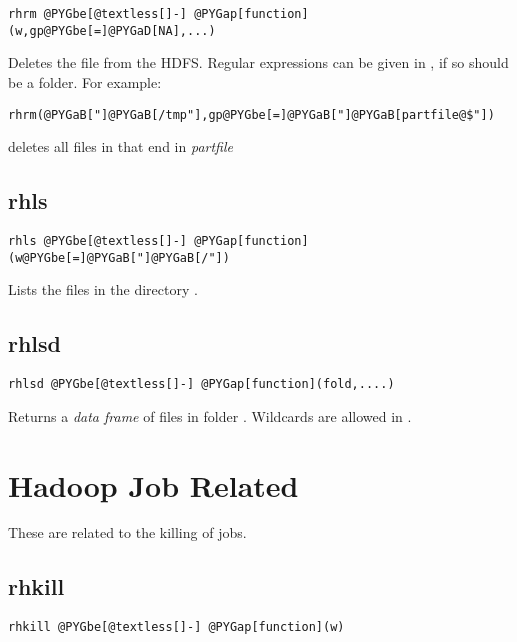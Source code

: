 \documentclass[letterpaper,10pt,english]{manual}
\begin{document}
\begin{Verbatim}[commandchars=@\[\]]
rhrm @PYGbe[@textless[]-] @PYGap[function](w,gp@PYGbe[=]@PYGaD[NA],...)
\end{Verbatim}

Deletes the file  from the HDFS. Regular expressions can be given in
, if so  should be a folder. For example:

\begin{Verbatim}[commandchars=@\[\]]
rhrm(@PYGaB["]@PYGaB[/tmp"],gp@PYGbe[=]@PYGaB["]@PYGaB[partfile@$"])
\end{Verbatim}

deletes all files in  that end in \emph{partfile}


\subsection{rhls}

\begin{Verbatim}[commandchars=@\[\]]
rhls @PYGbe[@textless[]-] @PYGap[function](w@PYGbe[=]@PYGaB["]@PYGaB[/"])
\end{Verbatim}

Lists the files in the directory .


\subsection{rhlsd}

\begin{Verbatim}[commandchars=@\[\]]
rhlsd @PYGbe[@textless[]-] @PYGap[function](fold,....)
\end{Verbatim}

Returns a \emph{data frame} of files in folder . Wildcards are allowed in
.


\section{Hadoop Job Related}

These are related to the killing of jobs.


\subsection{rhkill}

\begin{Verbatim}[commandchars=@\[\]]
rhkill @PYGbe[@textless[]-] @PYGap[function](w)
\end{Verbatim}
\end{document}
